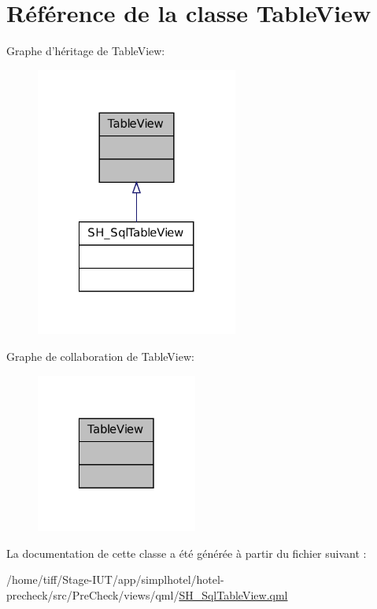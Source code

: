 \hypertarget{classTableView}{\section{Référence de la classe Table\-View}
\label{classTableView}
}


Graphe d'héritage de Table\-View\-:\nopagebreak
\begin{figure}[H]
\begin{center}
\leavevmode
\includegraphics[width=188pt]{classTableView__inherit__graph}
\end{center}
\end{figure}


Graphe de collaboration de Table\-View\-:\nopagebreak
\begin{figure}[H]
\begin{center}
\leavevmode
\includegraphics[width=150pt]{classTableView__coll__graph}
\end{center}
\end{figure}


La documentation de cette classe a été générée à partir du fichier suivant \-:\begin{DoxyCompactItemize}
\item 
/home/tiff/\-Stage-\/\-I\-U\-T/app/simplhotel/hotel-\/precheck/src/\-Pre\-Check/views/qml/\hyperlink{SH__SqlTableView_8qml}{S\-H\-\_\-\-Sql\-Table\-View.\-qml}\end{DoxyCompactItemize}
